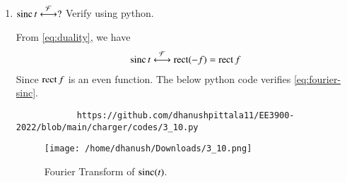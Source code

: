 \documentclass[journal,12pt,twocolumn]{IEEEtran}
\renewcommand\thesection{\arabic{section}}
\begin{document}
\begin{enumerate}[label=\thesection.\arabic*
		,ref=\thesection.\theenumi]
		\solution We write
		\begin{align}
			\rect{t}&\system{F}\int_{-\infty}^{\infty}\rect{t}e^{-\j2\pi ft}\, dt \\
			&=\int_{-\frac{1}{2}}^{\frac{1}{2}}e^{-\j2\pi ft}\, dt \\
			&=\frac{e^{\j\pi f} - e^{-\j\pi f}}{\j2\pi f} = \frac{\sin{\pi f}}{\pi f} = \sinc{f}
			\label{eq:fourier-rect}
		\end{align}
		The below python code verifies \eqref{eq:fourier-rect}.
		\begin{lstlisting}
			https://github.com/dhanushpittala11/EE3900-2022/blob/main/charger/codes/3_9.py
		\end{lstlisting}
		\begin{figure}[!ht]
			\texttt{[image: /home/dhanush/Downloads/3\_9.png]}
			\caption{Fourier Transform of $\rect(t)$.}
			\label{eq:fig-fourier-rect}
		\end{figure}
		\item $\mathop{\mathrm{sinc}}{t}\overset{\mathcal{F}}{ \longleftrightarrow} ?$  Verify using python.
		
		\solution From \eqref{eq:duality}, we have 
		\begin{align}
			\mathop{\mathrm{sinc}}{t}\overset{\mathcal{F}}{ \longleftrightarrow}\mathop{\mathrm{rect}}(-f)=\mathop{\mathrm{rect}}{f}
			\label{eq:fourier-sinc}
		\end{align}
		Since $\mathop{\mathrm{rect}}{f}$ is an even function.
		The below python code verifies \eqref{eq:fourier-sinc}.
		\begin{lstlisting}
			https://github.com/dhanushpittala11/EE3900-2022/blob/main/charger/codes/3_10.py
		\end{lstlisting}
		\begin{figure}[!ht]
			\texttt{[image: /home/dhanush/Downloads/3\_10.png]}
			\caption{Fourier Transform of $\mathop{\mathrm{sinc}}(t)$.}
			\label{eq:fig-fourier-sinc}
		\end{figure}
	\end{enumerate}
	
\end{document}
